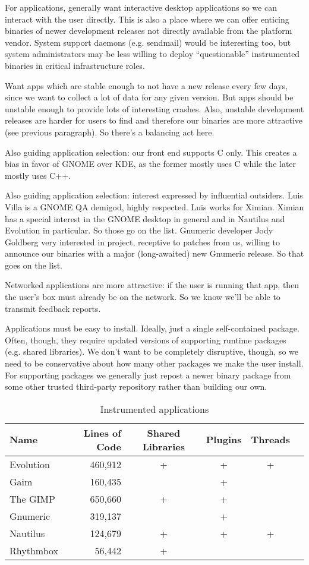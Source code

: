 \documentclass[10pt,twocolumn]{article}
\begin{document}
For applications, generally want interactive desktop applications so
we can interact with the user directly.  This is also a place where we
can offer enticing binaries of newer development releases not directly
available from the platform vendor.  System support daemons (e.g.
sendmail) would be interesting too, but system administrators may be
less willing to deploy ``questionable'' instrumented binaries in
critical infrastructure roles.

Want apps which are stable enough to not have a new release every few
days, since we want to collect a lot of data for any given version.
But apps should be unstable enough to provide lots of interesting
crashes.  Also, unstable development releases are harder for users to
find and therefore our binaries are more attractive (see previous
paragraph).  So there's a balancing act here.

Also guiding application selection: our front end supports C only.
This creates a bias in favor of GNOME over KDE, as the former mostly
uses C while the later mostly uses C++.

Also guiding application selection: interest expressed by influential
outsiders.  Luis Villa is a GNOME QA demigod, highly respected.  Luis
works for Ximian.  Ximian has a special interest in the GNOME desktop
in general and in Nautilus and Evolution in particular.  So those go
on the list.  Gnumeric developer Jody Goldberg very interested in
project, receptive to patches from us, willing to announce our
binaries with a major (long-awaited) new Gnumeric release.  So that
goes on the list.

Networked applications are more attractive: if the user is running
that app, then the user's box must already be on the network.  So we
know we'll be able to transmit feedback reports.

Applications must be easy to install.  Ideally, just a single
self-contained package.  Often, though, they require updated versions
of supporting runtime packages (e.g. shared libraries).  We don't want
to be completely disruptive, though, so we need to be conservative
about how many other packages we make the user install.  For
supporting packages we generally just repost a newer binary package
from some other trusted third-party repository rather than building
our own.

\begin{table*}
  \centering
  \begin{tabular}{lrcccc}
    Name & Lines of Code & Shared Libraries & Plugins & Threads \\\hline
    Evolution & 460,912 & + & + & + \\
    Gaim & 160,435 & & + & \\
    The GIMP & 650,660 & + & + & \\
    Gnumeric & 319,137 & & + & \\
    Nautilus & 124,679 & + & + & + \\
    Rhythmbox & 56,442 & + & &
  \end{tabular}
  \caption{Instrumented applications}
  \label{apps}
\end{table*}
\end{document}
